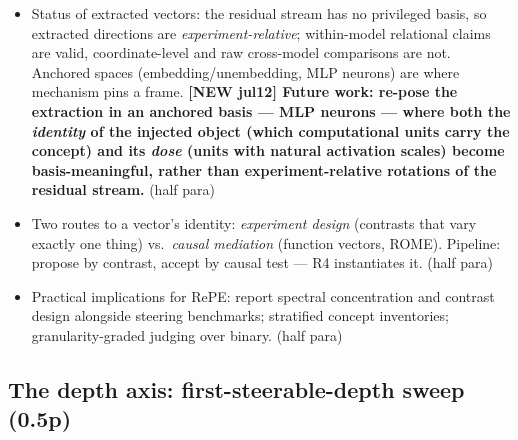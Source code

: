 \documentclass[11pt]{article}
\newenvironment{outline}{\color{gray!70!black}\begin{itemize}[leftmargin=1.2em,itemsep=1pt]}{\end{itemize}\color{black}}
\begin{document}
\begin{outline}
\item Status of extracted vectors: the residual stream has no privileged basis, so extracted directions are \emph{experiment-relative}; within-model relational claims are valid, coordinate-level and raw cross-model comparisons are not. Anchored spaces (embedding/unembedding, MLP neurons) are where mechanism pins a frame. \textbf{[NEW jul12] Future work: re-pose the extraction in an anchored basis --- MLP neurons --- where both the \emph{identity} of the injected object (which computational units carry the concept) and its \emph{dose} (units with natural activation scales) become basis-meaningful, rather than experiment-relative rotations of the residual stream.} (half para)
\item Two routes to a vector's identity: \emph{experiment design} (contrasts that vary exactly one thing) vs.\ \emph{causal mediation} (function vectors, ROME). Pipeline: propose by contrast, accept by causal test --- R4 instantiates it. (half para)
\item Practical implications for RePE: report spectral concentration and contrast design alongside steering benchmarks; stratified concept inventories; granularity-graded judging over binary. (half para)
\end{outline}

\subsection*{The depth axis: first-steerable-depth sweep (0.5p)}
\end{document}
